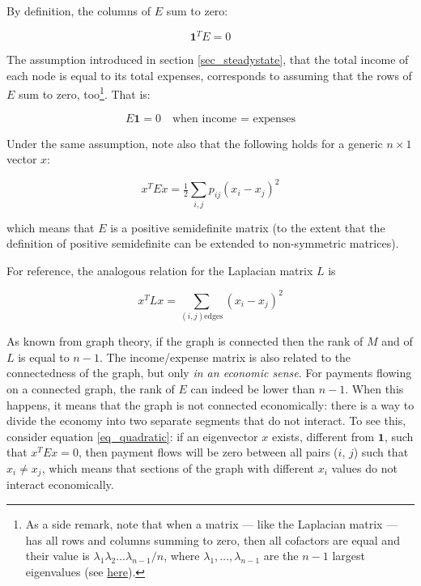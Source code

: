\documentclass[a4paper]{article}
\begin{document}
By definition, the columns of $E$ sum to zero:

\begin{equation}
\mathbf{1}^T E = 0
\end{equation}

The assumption introduced in section \ref{sec_steadystate}, that the total income of each node is equal to its total expenses, corresponds to assuming that the rows of $E$ sum to zero, too\footnote{As a side remark, note that when a matrix --- like the Laplacian matrix --- has all rows and columns summing to zero, then all cofactors are equal and their value is $\lambda_1 \lambda_2 \ldots \lambda_{n-1} / n$, where $\lambda_1, \ldots, \lambda_{n-1}$ are the $n-1$ largest eigenvalues (see \href{www.maths.qmul.ac.uk/~pjc/odds/zero.pdf}{here}).}. That is:

\begin{equation}
E \mathbf{1} = 0 \quad \textrm{when income = expenses}
\end{equation}

Under the same assumption, note also that the following holds for a generic $n \times 1$ vector $x$:

\begin{equation}\label{eq_quadratic}
x^T E x = \tfrac{1}{2} \sum_{i,j} p_{ij} (x_i-x_j)^2
\end{equation}

which means that $E$ is a positive semidefinite matrix (to the extent that the definition of positive semidefinite can be extended to non-symmetric matrices).

For reference, the analogous relation for the Laplacian matrix $L$ is

\begin{equation}
x^T L x = \sum_{(i,j) \mathrm{edges}} (x_i-x_j)^2
\end{equation}

As known from graph theory, if the graph is connected then the rank of $M$ and of $L$ is equal to $n-1$. The income/expense matrix is also related to the connectedness of the graph, but only \emph{in an economic sense}. For payments flowing on a connected graph, the rank of $E$ can indeed be lower than $n-1$. When this happens, it means that the graph is not connected economically: there is a way to divide the economy into two separate segments that do not interact. To see this, consider equation \eqref{eq_quadratic}: if an eigenvector $x$ exists, different from $\mathbf{1}$, such that $x^T E x = 0$, then payment flows will be zero between all pairs ($i$, $j$) such that $x_i \neq x_j$, which means that sections of the graph with different $x_i$ values do not interact economically.
\end{document}
